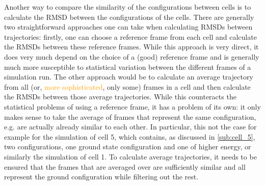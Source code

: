 Another way to compare the similarity of the configurations between cells is to calculate the RMSD between the configurations of the cells. There are generally two straightforward approaches one can take when calculating RMSDs between trajectories: firstly, one can choose a reference frame from each cell and calculate the RMSDs between these reference frames. While this approach is very direct, it does very much depend on the choice of a (good) reference frame and is generally much more susceptible to statistical variation between the different frames of a simulation run. The other approach would be to calculate an average trajectory from all (or, \textcolor{orange}{more sophisticated}, only some) frames in a cell and then calculate the RMSDs between those average trajectories. While this counteracts the statistical problems of using a reference frame, it has a problem of its own: it only makes sense to take the average of frames that represent the same configuration, e.g. are actually already similar to each other. In particular, this not the case for example for the simulation of cell 5, which contains, as discussed in \ref{sub:cell_5}, two configurations, one ground state configuration and one of higher energy, or similarly the simulation of cell 1. To calculate average trajectories, it needs to be ensured that the frames that are averaged over are sufficiently similar and all represent the ground configuration while filtering out the rest.

